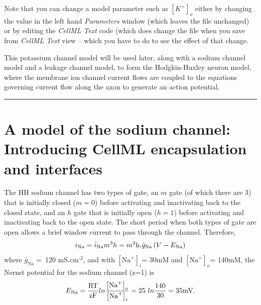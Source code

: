 \documentclass[a4paper,10pt,english]{sphinxmanual}
\begin{document}
Note that you can change a model parameter such as
\(\left\lbrack K^{+} \right\rbrack_{o}\) either by changing the
value in the left hand \emph{Parameters} window (which leaves the file
unchanged) or by editing the \emph{CellML Text} code (which does change the
file when you save from \emph{CellML Text} view – which you have to do to see
the effect of that change.

This potassium channel model will be used later, along with a sodium
channel model and a leakage channel model, to form the Hodgkin-Huxley
neuron model, where the membrane ion channel current flows are coupled
to the equations governing current flow along the axon to generate an
action potential.


\bigskip\hrule{}\bigskip



\chapter{A model of the sodium channel: Introducing CellML encapsulation and interfaces}
\label{cellml_encaps_and_inter::doc}\label{cellml_encaps_and_inter:a-model-of-the-sodium-channel-introducing-cellml-encapsulation-and-interfaces}
The HH sodium channel has two types of gate, an \(m\) gate (of which
there are 3) that is initially closed (\(m = 0\)) before activating
and inactivating back to the closed state, and an \(h\) gate that is
initially open (\(h = 1\)) before activating and inactivating back
to the open state. The short period when both types of gate are open
allows a brief window current to pass through the channel. Therefore,
\begin{gather}
\begin{split}i_{\text{Na}} = \bar{i}_{\text{Na}}m^{3}h = m^{3}\text{h.}\bar{g}_{\text{Na}}\left( V - E_{\text{Na}} \right)\end{split}\notag
\end{gather}
where \(\bar{g}_{\text{Na}} = \ \)120
mS.cm$^{\text{-2}}$, and with
\(\left\lbrack \text{Na}^{+} \right\rbrack_{i}\)= 30mM and
\(\left\lbrack \text{Na}^{+} \right\rbrack_{o}\)= 140mM, the
Nernst potential for the sodium channel (z=1) is
\begin{gather}
\begin{split}E_{\text{Na}} = \frac{\text{RT}}{\text{zF}}ln\frac{\left\lbrack \text{Na}^{+} \right\rbrack_{o}}{\left\lbrack \text{Na}^{+} \right\rbrack_{i}} = 25\ ln\frac{140}{30} = 35\text{mV}.\end{split}\notag
\end{gather}
\end{document}
